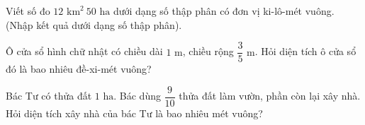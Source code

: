 \begin{ex} %
Viết số đo $12\text{ km}^2\ 50\text{ ha}$ dưới dạng số thập phân có đơn vị ki-lô-mét vuông. (Nhập kết quả dưới dạng số thập phân).
\end{ex}

\begin{ex} %
Ô cửa sổ hình chữ nhật có chiều dài $1\text{ m}$, chiều rộng $\dfrac{3}{5}\text{ m}$. Hỏi diện tích ô cửa sổ đó là bao nhiêu đề-xi-mét vuông?
\end{ex}

\begin{ex} %
Bác Tư có thửa đất $1\text{ ha}$. Bác dùng $\dfrac{9}{10}$ thửa đất làm vườn, phần còn lại xây nhà. Hỏi diện tích xây nhà của bác Tư là bao nhiêu mét vuông?
\end{ex}

